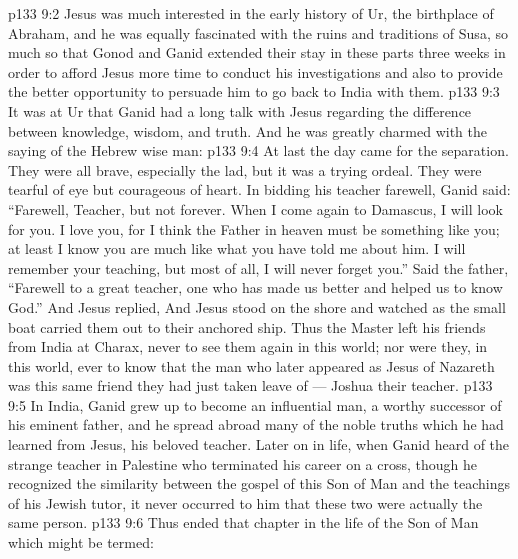 \vs p133 9:2 Jesus was much interested in the early history of Ur, the birthplace of Abraham, and he was equally fascinated with the ruins and traditions of Susa, so much so that Gonod and Ganid extended their stay in these parts three weeks in order to afford Jesus more time to conduct his investigations and also to provide the better opportunity to persuade him to go back to India with them.
\vs p133 9:3 It was at Ur that Ganid had a long talk with Jesus regarding the difference between knowledge, wisdom, and truth. And he was greatly charmed with the saying of the Hebrew wise man: 
\vs p133 9:4 \pc At last the day came for the separation. They were all brave, especially the lad, but it was a trying ordeal. They were tearful of eye but courageous of heart. In bidding his teacher farewell, Ganid said: “Farewell, Teacher, but not forever. When I come again to Damascus, I will look for you. I love you, for I think the Father in heaven must be something like you; at least I know you are much like what you have told me about him. I will remember your teaching, but most of all, I will never forget you.” Said the father, “Farewell to a great teacher, one who has made us better and helped us to know God.” And Jesus replied,  And Jesus stood on the shore and watched as the small boat carried them out to their anchored ship. Thus the Master left his friends from India at Charax, never to see them again in this world; nor were they, in this world, ever to know that the man who later appeared as Jesus of Nazareth was this same friend they had just taken leave of --- Joshua their teacher.
\vs p133 9:5 In India, Ganid grew up to become an influential man, a worthy successor of his eminent father, and he spread abroad many of the noble truths which he had learned from Jesus, his beloved teacher. Later on in life, when Ganid heard of the strange teacher in Palestine who terminated his career on a cross, though he recognized the similarity between the gospel of this Son of Man and the teachings of his Jewish tutor, it never occurred to him that these two were actually the same person.
\vs p133 9:6 \pc Thus ended that chapter in the life of the Son of Man which might be termed: 
